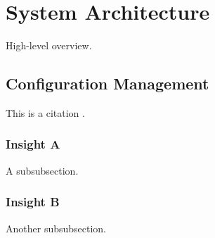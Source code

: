 \section{System Architecture}

High-level overview.

\subsection{Configuration Management}

This is a citation \cite{Lamport:LaTeX}.

\subsubsection{Insight A}
A subsubsection.

\subsubsection{Insight B}
Another subsubsection.